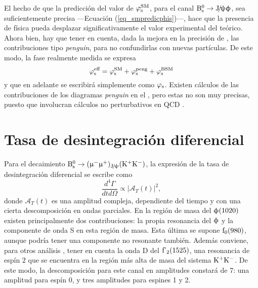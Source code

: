 \color{new}
El hecho de que la predicción del valor de $\varphi_{\text{s}}^{\text{SM}}$, para el canal $\text{B}{}_{\text{s}}^{\text{0}} \rightarrow \text{J}\!/\!\uppsi \upphi$, sea suficientemente precisa ---Ecuación (\ref{eq_smpredicphis})---, hace que la presencia de física \bstdmod pueda desplazar significativamente el valor experimental del teórico. Ahora bien, hay que tener en cuenta, dada la mejora en la precisión de \lhcb, las contribuciones tipo \emph{penguin}, para no confundirlas con nuevas partículas. De este modo, la fase realmente medida se expresa
\begin{equation}
\varphi_{\text{s}}^{\text{eff}}  = \varphi_{\text{s}}^{\text{SM}} + \varphi_{\text{s}}^{\text{peng}} + \varphi_{\text{s}}^{\text{BSM}}
\end{equation}
y que en adelante se escribirá simplemente como  $\varphi_{\text{s}}$. Existen cálculos de las contribuciones de los diagramas \emph{penguin} en el \stdmod, pero estas no son muy precisas, puesto que involucran cálculos no perturbativos en QCD \cite{liu2014penguin}.

\color{norm}

\section{Tasa de desintegración diferencial} %
\label{sec_diffrate}

Para el decaimiento \color{vero} $\text{B}{}_{\text{s}}^{\text{0}} \rightarrow (\upmu{}^{-} \upmu{}^{+})_{\text{J}\!/\!\uppsi} (\text{K}{}^{+}\text{K}{}^{-})$, \color{norm} la expresión de la tasa de desintegración diferencial se escribe como \cite{liu2014penguin}
\begin{equation}
\frac{d^4\Gamma}{dtd\Omega} \propto |\mathcal{A}_T(t)|^2,	
\end{equation}
donde $\mathcal{A}_T(t)$ es una amplitud compleja, dependiente del tiempo y con una cierta descomposición en ondas parciales. 
%
En la región de masa del $\upphi(1020)$ existen principalmente dos contribuciones: la propia resonancia del $\upphi$ \color{vero} y la componente de onda S en esta región de masa. Esta última se supone $\text{f}_0(980)$, aunque podría tener una componente no resonante también. \color{norm} Además conviene, para otros análisis \cite{Aaij:2017zgz}, tener en cuenta la onda D del $\text{f'}_2(1525)$, una resonancia de espín $2$ que se encuentra en la región más alta de masa del sistema $\text{K}{}^{+}\text{K}{}^{-}$. De este modo, la descomposición para este canal en amplitudes constará de 7: una amplitud para espín 0, y tres amplitudes para espines 1 y 2.

